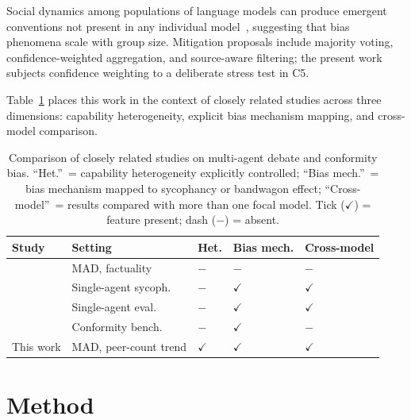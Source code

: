 \documentclass[review,3p,authoryear]{elsarticle}
\begin{document}
Social dynamics among populations of language models can produce emergent
conventions not present in any individual model~\citep{ashery2025emergent},
suggesting that bias phenomena scale with group size.
Mitigation proposals include majority voting, confidence-weighted
aggregation, and source-aware filtering; the present work subjects
confidence weighting to a deliberate stress test in C5.

Table~\ref{tab:relwork} places this work in the context of closely related
studies across three dimensions: capability heterogeneity, explicit bias
mechanism mapping, and cross-model comparison.

\begin{table}[t]
\centering
\small
\caption{Comparison of closely related studies on multi-agent debate and
conformity bias. ``Het.''\ = capability heterogeneity explicitly controlled;
``Bias mech.''\ = bias mechanism mapped to sycophancy or bandwagon effect;
``Cross-model''\ = results compared with more than one focal model.
Tick ($\checkmark$) = feature present; dash ($-$) = absent.
\label{tab:relwork}}
\begin{tabular}{@{}lllll@{}}
\toprule
Study & Setting & Het. & Bias mech. & Cross-model \\
\midrule
\citet{du2023improving}          & MAD, factuality       & $-$          & $-$          & $-$          \\
\citet{sharma2023towards}        & Single-agent sycoph.  & $-$          & $\checkmark$ & $\checkmark$ \\
\citet{koo2024benchmarking}      & Single-agent eval.    & $-$          & $\checkmark$ & $\checkmark$ \\
\citet{weng2025benchform}        & Conformity bench.     & $-$          & $\checkmark$ & $-$          \\
This work                        & MAD, peer-count trend & $\checkmark$ & $\checkmark$ & $\checkmark$ \\
\bottomrule
\end{tabular}
\end{table}

\section{Method}
\label{sec:method}

\end{document}
